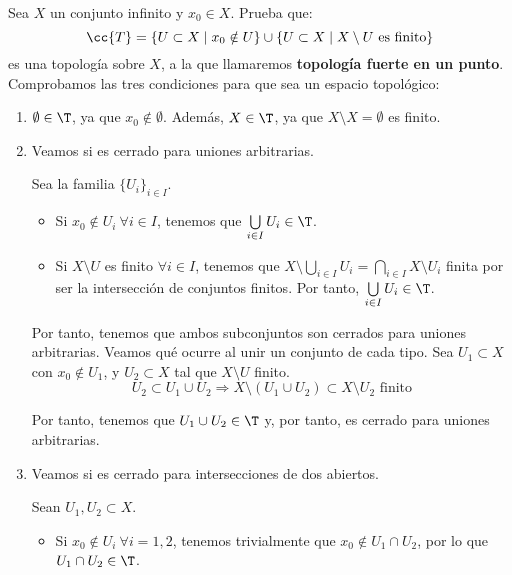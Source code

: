 \begin{ejercicio}
    Sea $X$ un conjunto infinito y $x_0\in X$. Prueba que:
    \begin{equation*}
        \cc{T}=\{U\subset X\mid x_0\notin U\}\cup \{U\subset X\mid X\setminus U \text{ es finito}\}
    \end{equation*}
    es una topología sobre $X$, a la que llamaremos \textbf{topología fuerte en un punto}.\\
        
    Comprobamos las tres condiciones para que sea un espacio topológico:
    \begin{enumerate}
        \item $\emptyset \in \T$, ya que $x_0\notin \emptyset$. Además, $X\in \T$, ya que $X\setminus X = \emptyset$ es finito.
        
        \item Veamos si es cerrado para uniones arbitrarias.

        Sea la familia $\{U_i\}_{i\in I}$.
        \begin{itemize}
            \item Si $x_0\notin U_i~\forall i\in I$, tenemos que $\bigcup\limits_{i\in I}U_i\in \T$.
            \item Si $X\setminus U$ es finito $\forall i\in I$, tenemos que $X\setminus \bigcup\limits_{i\in I}U_i = \bigcap\limits_{i\in I}X\setminus U_i$ finita por ser la intersección de conjuntos finitos. Por tanto, $\bigcup\limits_{i\in I}U_i\in \T$.
        \end{itemize}
        Por tanto, tenemos que ambos subconjuntos son cerrados para uniones arbitrarias. Veamos qué ocurre al unir un conjunto de cada tipo. Sea $U_1\subset X$ con $x_0\notin U_1$, y $U_2\subset X$ tal que $X\setminus U$ finito.
        \begin{equation*}
            U_2\subset U_1\cup U_2 \Longrightarrow X\setminus (U_1\cup U_2) \subset X\setminus  U_2 \text{ finito}
        \end{equation*}

        Por tanto, tenemos que $U_1\cup U_2\in \T$ y, por tanto, es cerrado para uniones arbitrarias.

        \item Veamos si es cerrado para intersecciones de dos abiertos.

        Sean $U_1, U_2\subset X$.
        \begin{itemize}
            \item Si $x_0\notin U_i~\forall i=1,2$, tenemos trivialmente que $x_0\notin U_1\cap U_2$, por lo que $U_1\cap U_2\in \T$.
            

\end{itemize}
\end{enumerate}
\end{ejercicio}
